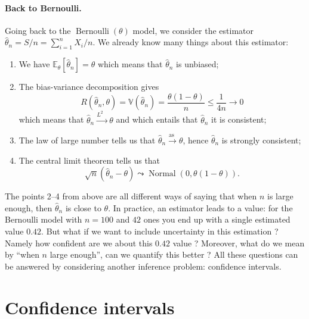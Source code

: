 \documentclass[
	fontsize=11pt, %
	twoside=false, %
	numbers=noenddot, %
]{kaobook}
\DeclareMathOperator{\nor}{Normal}
\DeclareMathOperator{\ber}{Bernoulli}
\newcommand{\E}{\mathbb E}
\newcommand{\var}{\mathbb V}
\newcommand{\wh}{\widehat}
\newcommand{\goas}{\overset{\text{as\ }}{\rightarrow}}
\newcommand{\goqr}{\overset{\text{$L^2$\ }}{\rightarrow}}
\begin{document}
\paragraph{Back to Bernoulli.} %

Going back to the $\ber(\theta)$ model, we consider the estimator $\wh \theta_n = S / n = \sum_{i=1}^n X_i / n$.
We already know many things about this estimator:
\begin{enumerate}
	\item We have $\E_\theta [\wh \theta_n] = \theta$ which means that $\wh \theta_n$ is unbiased;
	\item The bias-variance decomposition gives
	\begin{equation}
		\label{eq:bernoulli-quadratic-risk}
	 	R(\wh \theta_n, \theta) = \var(\wh \theta_n) = \frac{\theta (1 - \theta)}{n} \leq 
	 	\frac{1}{4 n} \rightarrow 0
	 \end{equation}
	 which means that $\wh \theta_n \goqr \theta$ and which entails that $\wh \theta_n$ it is consistent;
	\item The law of large number tells us that $\wh \theta_n \goas \theta$, hence $\wh \theta_n$ is strongly consistent;
	\item The central limit theorem tells us that
	\begin{equation}
	\label{eq:tcl-bernoulli}
	\sqrt n (\wh \theta_n - \theta) \leadsto \nor(0, \theta(1 - \theta)).
	\end{equation}
\end{enumerate}
The points 2--4 from above are all different ways of saying that when $n$ is large enough, then $\wh \theta_n$ is close to $\theta$.
In practice, an estimator leads to a value: for the Bernoulli model with $n=100$ and $42$ ones you end up with a single estimated value $0.42$.
But what if we want to include uncertainty in this estimation ?
Namely how confident are we about this $0.42$ value ?
Moreover, what do we mean by ``when $n$ large enough'', can we quantify this better ?
All these questions can be answered by considering another inference problem: confidence intervals.

\section{Confidence intervals} %
\label{sec:confidence_intervals}
\end{document}
